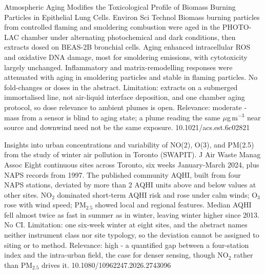 \documentclass[10pt]{article}
\begin{document}
{Atmospheric Aging Modifies the Toxicological Profile of Biomass Burning Particles in Epithelial Lung Cells.}
{Environ Sci Technol}
{Biomass burning particles from controlled flaming and smoldering combustion were aged in the PHOTO-LAC chamber under alternating photochemical and dark conditions, then extracts dosed on BEAS-2B bronchial cells. Aging enhanced intracellular ROS and oxidative DNA damage, most for smoldering emissions, with cytotoxicity largely unchanged. Inflammatory and matrix-remodelling responses were attenuated with aging in smoldering particles and stable in flaming particles. No fold-changes or doses in the abstract. Limitation: extracts on a submerged immortalised line, not air-liquid interface deposition, and one chamber aging protocol, so dose relevance to ambient plumes is open. Relevance: moderate - mass from a sensor is blind to aging state; a plume reading the same $\mu$g\,m$^{-3}$ near source and downwind need not be the same exposure.}
{10.1021/acs.est.6c02821}

\par{}\baselineskip{}\baselineskip
{}

{Insights into urban concentrations and variability of NO(2), O(3), and PM(2.5) from the study of winter air pollution in Toronto (SWAPIT).}
{J Air Waste Manag Assoc}
{Eight continuous sites across Toronto, six weeks January-March 2024, plus NAPS records from 1997. The published community AQHI, built from four NAPS stations, deviated by more than 2 AQHI units above and below values at other sites. NO$_2$ dominated short-term AQHI risk and rose under calm winds; O$_3$ rose with wind speed; PM$_{2.5}$ showed local and regional features. Median AQHI fell almost twice as fast in summer as in winter, leaving winter higher since 2013. No CI. Limitation: one six-week winter at eight sites, and the abstract names neither instrument class nor site typology, so the deviation cannot be assigned to siting or to method. Relevance: high - a quantified gap between a four-station index and the intra-urban field, the case for denser sensing, though NO$_2$ rather than PM$_{2.5}$ drives it.}
{10.1080/10962247.2026.2743096}
\end{document}
